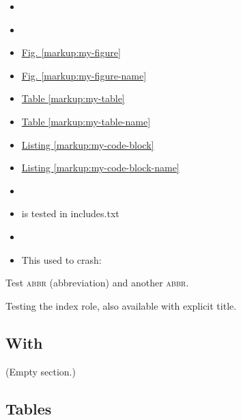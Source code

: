 \documentclass[letterpaper,10pt,english]{sphinxhowto}
\begin{document}
\begin{itemize}
\item {} 
{\hyperref[markup:my\string-code\string-block]{}}

\item {} 
{\hyperref[markup:my\string-code\string-block\string-name]{}}

\item {} 
\hyperref[markup:my-figure]{Fig. \ref{markup:my-figure}}

\item {} 
\hyperref[markup:my-figure-name]{Fig. \ref{markup:my-figure-name}}

\item {} 
\hyperref[markup:my-table]{Table \ref{markup:my-table}}

\item {} 
\hyperref[markup:my-table-name]{Table \ref{markup:my-table-name}}

\item {} 
\hyperref[markup:my-code-block]{Listing \ref{markup:my-code-block}}

\item {} 
\hyperref[markup:my-code-block-name]{Listing \ref{markup:my-code-block-name}}

\item {} 
{\hyperref[subdir/includes::doc]{}}

\item {} 
 is tested in includes.txt

\item {} 
{\hyperref[objects:cmdoption\string-python\string-c]{}}

\item {} 
This used to crash: 

\end{itemize}

Test \textsc{abbr} (abbreviation) and another \textsc{abbr}.

Testing the index role, also available with
explicit title.


\subsection{With}
\label{markup:with}\label{markup:id1}
(Empty section.)


\subsection{Tables}
\label{markup:tables}
\end{document}
